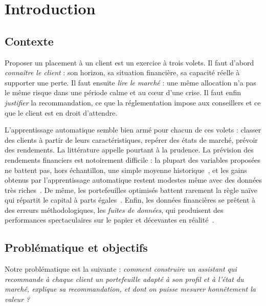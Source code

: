 \section{Introduction}
\label{sec:introduction}

\subsection{Contexte}

Proposer un placement à un client est un exercice à trois volets. Il faut d'abord \emph{connaître le client} : son horizon, sa situation financière, sa capacité réelle à supporter une perte. Il faut ensuite \emph{lire le marché} : une même allocation n'a pas le même risque dans une période calme et au cœur d'une crise. Il faut enfin \emph{justifier} la recommandation, ce que la réglementation impose aux conseillers et ce que le client est en droit d'attendre.

L'apprentissage automatique semble bien armé pour chacun de ces volets : classer des clients à partir de leurs caractéristiques, repérer des états de marché, prévoir des rendements. La littérature appelle pourtant à la prudence. La prévision des rendements financiers est notoirement difficile : la plupart des variables proposées ne battent pas, hors échantillon, une simple moyenne historique~\cite{welch2008}, et les gains obtenus par l'apprentissage automatique restent modestes même avec des données très riches~\cite{gu2020}. De même, les portefeuilles optimisés battent rarement la règle naïve qui répartit le capital à parts égales~\cite{demiguel2009}. Enfin, les données financières se prêtent à des erreurs méthodologiques, les \emph{fuites de données}, qui produisent des performances spectaculaires sur le papier et décevantes en réalité~\cite{lopezdeprado2018}.

\subsection{Problématique et objectifs}

Notre problématique est la suivante : \emph{comment construire un assistant qui recommande à chaque client un portefeuille adapté à son profil et à l'état du marché, explique sa recommandation, et dont on puisse mesurer honnêtement la valeur ?}

